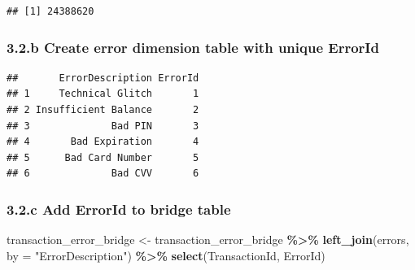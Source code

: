 \documentclass[
]{article}
\newenvironment{Shaded}{\begin{snugshade}}{\end{snugshade}}
\newcommand{\AttributeTok}[1]{\textcolor[rgb]{0.13,0.29,0.53}{#1}}
\newcommand{\CommentTok}[1]{\textcolor[rgb]{0.56,0.35,0.01}{\textit{#1}}}
\newcommand{\DecValTok}[1]{\textcolor[rgb]{0.00,0.00,0.81}{#1}}
\newcommand{\FunctionTok}[1]{\textcolor[rgb]{0.13,0.29,0.53}{\textbf{#1}}}
\newcommand{\NormalTok}[1]{#1}
\newcommand{\OtherTok}[1]{\textcolor[rgb]{0.56,0.35,0.01}{#1}}
\newcommand{\SpecialCharTok}[1]{\textcolor[rgb]{0.81,0.36,0.00}{\textbf{#1}}}
\newcommand{\StringTok}[1]{\textcolor[rgb]{0.31,0.60,0.02}{#1}}
\begin{document}
\begin{verbatim}
## [1] 24388620
\end{verbatim}

\subsubsection{3.2.b Create error dimension table with unique
ErrorId}\label{b-create-error-dimension-table-with-unique-errorid}

\begin{Shaded}
\end{Shaded}

\begin{verbatim}
##       ErrorDescription ErrorId
## 1     Technical Glitch       1
## 2 Insufficient Balance       2
## 3              Bad PIN       3
## 4       Bad Expiration       4
## 5      Bad Card Number       5
## 6              Bad CVV       6
\end{verbatim}

\subsubsection{3.2.c Add ErrorId to bridge
table}\label{c-add-errorid-to-bridge-table}

\begin{Shaded}
\begin{Highlighting}[]
\NormalTok{transaction\_error\_bridge }\OtherTok{\textless{}{-}}\NormalTok{ transaction\_error\_bridge }\SpecialCharTok{\%\textgreater{}\%}
  \FunctionTok{left\_join}\NormalTok{(errors, }\AttributeTok{by =} \StringTok{"ErrorDescription"}\NormalTok{) }\SpecialCharTok{\%\textgreater{}\%}
  \FunctionTok{select}\NormalTok{(TransactionId, ErrorId)}
\end{Highlighting}
\end{Shaded}
\end{document}
